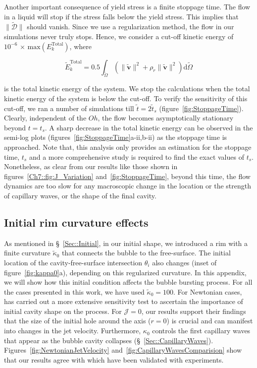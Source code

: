 \begin{subappendices}
Another important consequence of yield stress is a finite stoppage time. The flow in a liquid will stop if the stress falls below the yield stress. This implies that $\|\boldsymbol{\tilde{\mathcal{D}}}\|$ should vanish. Since we use a regularization method, the flow in our simulations never truly stops. Hence, we consider a cut-off kinetic energy of $10^{-6}\,\times\,\text{max}(E_k^\text{Total})$, where

\begin{equation}\label{Eqn::E_kTotal}
	\tilde E_k^\text{Total} = 0.5\int_{\tilde\Omega}\left(\|\boldsymbol{\tilde v}\|^2 + \rho_r\|\boldsymbol{\tilde v}\|^2\right)\mathrm{d}\tilde \Omega
\end{equation}

is the total kinetic energy of the system. We stop the calculations when the total kinetic energy of the system is below the cut-off. To verify the sensitivity of this cut-off, we ran a number of simulations till $\tilde t = 2\tilde t_s$ (figure~\ref{fig:StoppageTime}). Clearly, independent of the $Oh$, the flow becomes asymptotically stationary beyond $t = t_s$. A sharp decrease in the total kinetic energy can be observed in the semi-log plots (figures~\ref{fig:StoppageTime}a-ii,b-ii) as the stoppage time is approached. Note that, this analysis only provides an estimation for the stoppage time, $t_s$ and a more comprehensive study is required to find the exact values of $t_s$. Nonetheless, as clear from our results like those shown in  figures~\ref{Ch7::fig:J_Variation} and~\ref{fig:StoppageTime}, beyond this time, the flow dynamics are too slow for any macroscopic change in the location or the strength of capillary waves, or the shape of the final cavity.

\subsection{Initial rim curvature effects}\label{App::FilletCurvature}

As mentioned in \S~\ref{Sec::Initial}, in our initial shape, we introduced a rim with a finite curvature $\tilde \kappa_0$ that connects the bubble to the free-surface. The initial location of the cavity-free-surface intersection $\theta_i$ also changes (inset of figure~\ref{fig:kappa0}a), depending on this regularized curvature. In this appendix, we will show how this initial condition affects the bubble bursting process. For all the cases presented in this work, we have used $\tilde \kappa_0 = 100$. For Newtonian cases, \citet{deike2018dynamics} has carried out a more extensive sensitivity test to ascertain the importance of initial cavity shape on the process. For $\mathcal{J} = 0$, our results support their findings that the size of the initial hole around the axis ($r = 0$) is crucial and can manifest into changes in the jet velocity. Furthermore, $\kappa_0$ controls the first capillary waves that appear as the bubble cavity collapses (\S~\ref{Sec::CapillaryWaves}). Figures~\ref{fig:NewtonianJetVelocity} and~\ref{fig:CapillaryWavesComparision} show that our results agree with \citep{deike2018dynamics, gordillo2019capillary} which have been validated with experiments.


\end{subappendices}
